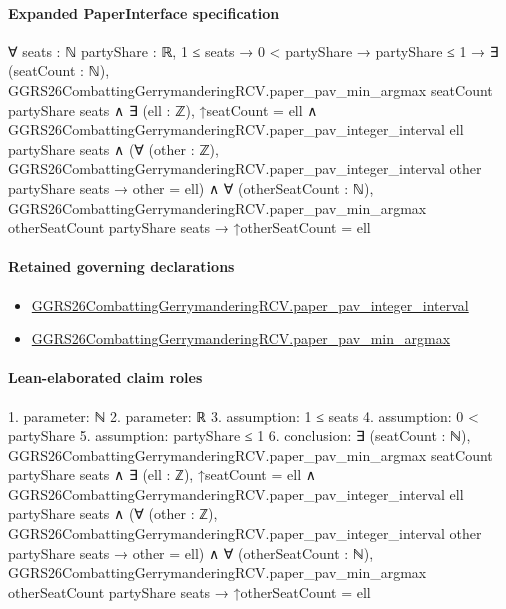 \documentclass[10pt]{article}
\begin{document}
\paragraph{Expanded PaperInterface specification}
\begin{ReviewVerbatim}
∀ {seats : ℕ} {partyShare : ℝ},
  1 ≤ seats →
    0 < partyShare →
      partyShare ≤ 1 →
        ∃ (seatCount : ℕ),
          GGRS26CombattingGerrymanderingRCV.paper_pav_min_argmax seatCount partyShare seats ∧
            ∃ (ell : ℤ),
              ↑seatCount = ell ∧
                GGRS26CombattingGerrymanderingRCV.paper_pav_integer_interval ell partyShare seats ∧
                  (∀ (other : ℤ),
                      GGRS26CombattingGerrymanderingRCV.paper_pav_integer_interval other partyShare seats →
                        other = ell) ∧
                    ∀ (otherSeatCount : ℕ),
                      GGRS26CombattingGerrymanderingRCV.paper_pav_min_argmax otherSeatCount partyShare seats →
                        ↑otherSeatCount = ell
\end{ReviewVerbatim}

\paragraph{Retained governing declarations}
\begin{itemize}\raggedright
\item \hyperlink{governing-declaration-71aa9e7dd85c440d}{GGRS26\allowbreak{}Combatting\allowbreak{}Gerrymandering\allowbreak{}RCV.\allowbreak{}paper\_\allowbreak{}pav\_\allowbreak{}integer\_\allowbreak{}interval}
\item \hyperlink{governing-declaration-656ba6456b1c16b1}{GGRS26\allowbreak{}Combatting\allowbreak{}Gerrymandering\allowbreak{}RCV.\allowbreak{}paper\_\allowbreak{}pav\_\allowbreak{}min\_\allowbreak{}argmax}
\end{itemize}
\paragraph{Lean-elaborated claim roles}\begin{ReviewVerbatim}
1. parameter: ℕ
2. parameter: ℝ
3. assumption: 1 ≤ seats
4. assumption: 0 < partyShare
5. assumption: partyShare ≤ 1
6. conclusion: ∃ (seatCount : ℕ),
  GGRS26CombattingGerrymanderingRCV.paper_pav_min_argmax seatCount partyShare seats ∧
    ∃ (ell : ℤ),
      ↑seatCount = ell ∧
        GGRS26CombattingGerrymanderingRCV.paper_pav_integer_interval ell partyShare seats ∧
          (∀ (other : ℤ),
              GGRS26CombattingGerrymanderingRCV.paper_pav_integer_interval other partyShare seats → other = ell) ∧
            ∀ (otherSeatCount : ℕ),
              GGRS26CombattingGerrymanderingRCV.paper_pav_min_argmax otherSeatCount partyShare seats →
                ↑otherSeatCount = ell
\end{ReviewVerbatim}
\end{document}
